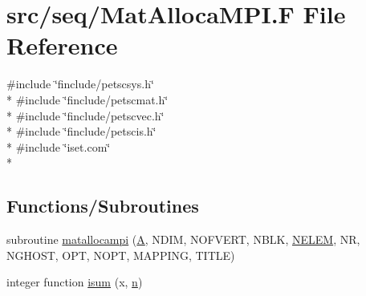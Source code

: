 \hypertarget{seq_2_mat_alloca_m_p_i_8_f}{\section{src/seq/\-Mat\-Alloca\-M\-P\-I.F File Reference}
\label{seq_2_mat_alloca_m_p_i_8_f}
}
{\ttfamily \#include \char`\"{}finclude/petscsys.\-h\char`\"{}}\\*
{\ttfamily \#include \char`\"{}finclude/petscmat.\-h\char`\"{}}\\*
{\ttfamily \#include \char`\"{}finclude/petscvec.\-h\char`\"{}}\\*
{\ttfamily \#include \char`\"{}finclude/petscis.\-h\char`\"{}}\\*
{\ttfamily \#include \char`\"{}iset.\-com\char`\"{}}\\*
\subsection*{Functions/\-Subroutines}
\begin{DoxyCompactItemize}
\item 
subroutine \hyperlink{seq_2_mat_alloca_m_p_i_8_f_ab05c3db5e1682afcf4ea5fb6d0b2bbdf}{matallocampi} (\hyperlink{ibc2_8com_ad2108d58343608772fff791c23da58f5}{A}, N\-D\-I\-M, N\-O\-F\-V\-E\-R\-T, N\-B\-L\-K, \hyperlink{mesh_8com_aee5e75b79d0e815c0603cfbccc618957}{N\-E\-L\-E\-M}, N\-R, N\-G\-H\-O\-S\-T, O\-P\-T, N\-O\-P\-T, M\-A\-P\-P\-I\-N\-G, T\-I\-T\-L\-E)
\item 
integer function \hyperlink{seq_2_mat_alloca_m_p_i_8_f_a02f30f3c61aa8e65498203cd9dcdb315}{isum} (x, \hyperlink{time_8com_a24bdc4a048267ff98f6f8137112e6f2f}{n})
\end{DoxyCompactItemize}


